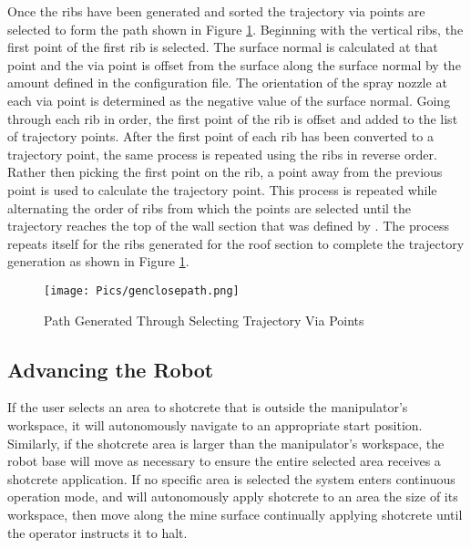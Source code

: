 Once the ribs have been generated and sorted the trajectory via points are selected to form the path shown in Figure \ref{fig:path}. Beginning with the vertical ribs, the first point of the first rib is selected. The surface normal is calculated at that point and the via point is offset from the surface along the surface normal by the amount defined in the configuration file. The orientation of the spray nozzle at each via point is determined as the negative value of the surface normal. Going through each rib in order, the first point of the rib is offset and added to the list of trajectory points. After the first point of each rib has been converted to a trajectory point, the same process is repeated using the ribs in reverse order. Rather then picking the first point on the rib, a point  away from the previous point is used to calculate the trajectory point. This process is repeated while alternating the order of ribs from which the points are selected until the trajectory reaches the top of the wall section that was defined by . The process repeats itself for the ribs generated for the roof section to complete the trajectory generation as shown in Figure \ref{fig:path}.\\

\begin{figure}[h]
    \centering
    \texttt{[image: Pics/genclosepath.png]}
    \caption{Path Generated Through Selecting Trajectory Via Points}
    \label{fig:path}
\end{figure}
\subsection{Advancing the Robot}

If the user selects an area to shotcrete that is outside the manipulator's workspace, it will autonomously navigate to an appropriate start position. Similarly, if the shotcrete area is larger than the manipulator's workspace, the robot base will move as necessary to ensure the entire selected area receives a shotcrete application. If no specific area is selected the system enters continuous operation mode, and will autonomously apply shotcrete to an area the size of its workspace, then move along the mine surface continually applying shotcrete until the operator instructs it to halt.\\

